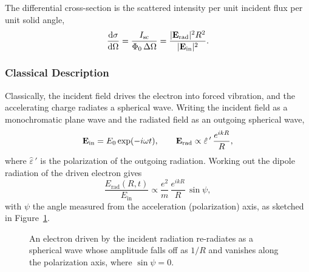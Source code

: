 \begin{definition}
The differential cross-section is the scattered intensity per unit incident flux per unit solid angle,
\begin{equation}
    \dv{\sigma}{\Omega} = \frac{I_{\text{sc}}}{\Phi_0\,\Delta\Omega} = \frac{|\cvect{E}_{\text{rad}}|^2 R^2}{|\cvect{E}_{\text{in}}|^2}.
\end{equation}
\end{definition}

\subsubsection{Classical Description}

Classically, the incident field drives the electron into forced vibration, and the accelerating charge radiates a spherical wave. Writing the incident field as a monochromatic plane wave and the radiated field as an outgoing spherical wave,
\begin{equation}
    \cvect{E}_{\text{in}} = E_0\exp(-i\omega t), \qquad
    \cvect{E}_{\text{rad}} \propto \hat{\varepsilon}\,'\,\frac{e^{ikR}}{R},
\end{equation}
where $\hat{\varepsilon}\,'$ is the polarization of the outgoing radiation. Working out the dipole radiation of the driven electron gives
\begin{equation}
    \frac{E_{\text{rad}}(R,t)}{E_{\text{in}}} \propto \frac{e^2}{m}\,\frac{e^{ikR}}{R}\,\sin\psi,
\end{equation}
with $\psi$ the angle measured from the acceleration (polarization) axis, as sketched in Figure~\ref{fig:xrd-spherical}.

\begin{figure}[ht]
\centering
{}
\caption{An electron driven by the incident radiation re-radiates as a spherical wave whose amplitude falls off as $1/R$ and vanishes along the polarization axis, where $\sin\psi = 0$.}
\label{fig:xrd-spherical}
\end{figure}

